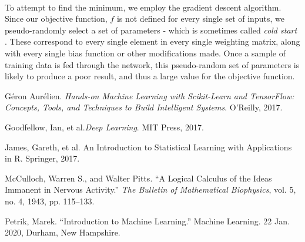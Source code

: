 \documentclass[12pt,letterpaper]{article}
\begin{document}
\paragraph*{}To attempt to find the minimum, we employ the gradient descent algorithm. Since our objective function, $f$ is not defined for every single set of inputs, we pseudo-randomly select a set of parameters - which is sometimes called \textit{cold start} \cite{Goodfellow}. These correspond to every single element in every single weighting matrix, along with every single bias function or other modifications made. Once a sample of training data is fed through the network, this pseudo-random set of parameters is likely to produce a poor result, and thus a large value for the objective function.





\begin{thebibliography}{9}


Géron Aurélien. \textit{Hands-on Machine Learning with Scikit-Learn and TensorFlow: Concepts, Tools, and Techniques to Build Intelligent Systems}. O'Reilly, 2017.

Goodfellow, Ian, et al.\textit{Deep Learning}. MIT Press, 2017.

James, Gareth, et al. {An Introduction to Statistical Learning with Applications in R}. Springer, 2017.

McCulloch, Warren S., and Walter Pitts. “A Logical Calculus of the Ideas Immanent in Nervous Activity.” \textit{The Bulletin of Mathematical Biophysics}, vol. 5, no. 4, 1943, pp. 115–133.

Petrik, Marek. “Introduction to Machine Learning.” Machine Learning. 22 Jan. 2020, Durham, New Hampshire.

\end{thebibliography}

\end{document}
